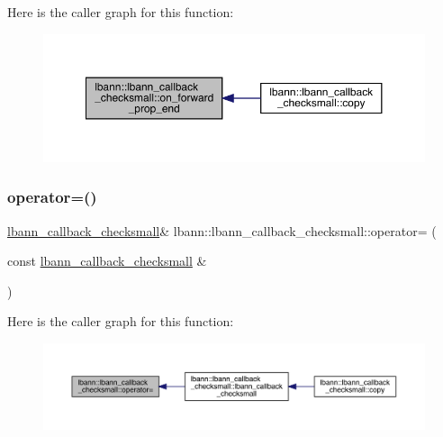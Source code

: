 Here is the caller graph for this function\+:\nopagebreak
\begin{figure}[H]
\begin{center}
\leavevmode
\includegraphics[width=350pt]{classlbann_1_1lbann__callback__checksmall_a2f50695feb1444145bae251f2e94b721_icgraph}
\end{center}
\end{figure}
\mbox{\label{classlbann_1_1lbann__callback__checksmall_a9488b223c8ae4beb87a6bd6d01c6d14d}} 
\subsubsection{\texorpdfstring{operator=()}{operator=()}}
{\footnotesize\ttfamily \hyperlink{classlbann_1_1lbann__callback__checksmall}{lbann\+\_\+callback\+\_\+checksmall}\& lbann\+::lbann\+\_\+callback\+\_\+checksmall\+::operator= (\begin{DoxyParamCaption}\item[{const \hyperlink{classlbann_1_1lbann__callback__checksmall}{lbann\+\_\+callback\+\_\+checksmall} \&}]{ }\end{DoxyParamCaption})\hspace{0.3cm}{\ttfamily [default]}}

Here is the caller graph for this function\+:\nopagebreak
\begin{figure}[H]
\begin{center}
\leavevmode
\includegraphics[width=350pt]{classlbann_1_1lbann__callback__checksmall_a9488b223c8ae4beb87a6bd6d01c6d14d_icgraph}
\end{center}
\end{figure}


